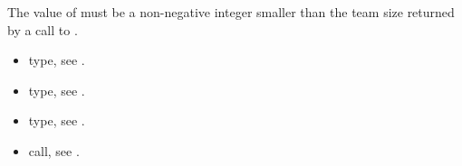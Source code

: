 \restrictions
The value of  must be a non-negative integer smaller than the
team size returned by a call to .

\crossreferences
\begin{itemize}
  \item {} type, see .
	\item {} type, see .
	\item {} type, see .
	\item {} call, see .
\end{itemize}

%
%
\label{subsubsubsec:ompd_get_master_thread_in_parallel}
%
%
%
%
%
%
%


